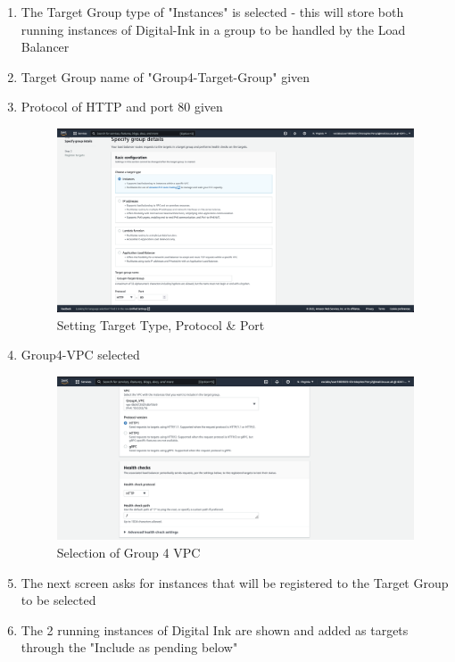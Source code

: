 \begin{enumerate}
	\item The Target Group type of "Instances" is selected - this will store both running instances of Digital-Ink in a group
	      to be handled by the Load Balancer
	\item Target Group name of "Group4-Target-Group" given
	\item Protocol of HTTP and port 80 given \begin{figure}[H]
												 \centering
												 \includegraphics[width=\textwidth]{resources/elb/elb-target-group-basic-config.png}
												 \caption{Setting Target Type, Protocol \& Port}
												 \label{fig:elb-target-group-basic-config}
	\end{figure}
	\item Group4-VPC selected \begin{figure}[H]
	      \centering
	      \includegraphics[width=\textwidth]{resources/elb/elb-vpc.png}
	      \caption{Selection of Group 4 VPC}
	      \label{fig:elb-vpc}
	\end{figure}
	\item The next screen asks for instances that will be registered to the Target Group to be selected
	\item The 2 running instances of Digital Ink are shown and added as targets through the "Include as pending below"

\end{enumerate}
